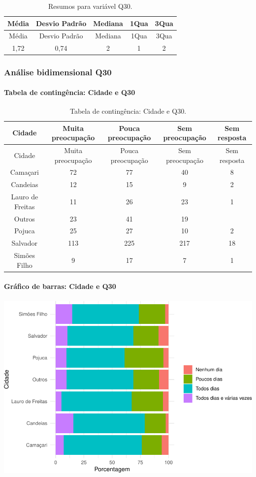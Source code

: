 \documentclass[]{article}
\let\oldparagraph\paragraph
\renewcommand{\paragraph}[1]{\oldparagraph{#1}\mbox{}}
\begin{document}
\begin{longtable}[]{@{}ccccc@{}}
\caption{\label{tab:unnamed-chunk-956}Resumos para variável Q30.}\tabularnewline
\toprule
Média & Desvio Padrão & Mediana & 1Qua & 3Qua\tabularnewline
\midrule
\endfirsthead
\toprule
Média & Desvio Padrão & Mediana & 1Qua & 3Qua\tabularnewline
\midrule
\endhead
1,72 & 0,74 & 2 & 1 & 2\tabularnewline
\bottomrule
\end{longtable}

\cleardoublepage

\hypertarget{anuxe1lise-bidimensional-q30}{%
\subsubsection{Análise bidimensional Q30}\label{anuxe1lise-bidimensional-q30}}

\hypertarget{tabela-de-continguxeancia-cidade-e-q30}{%
\paragraph{Tabela de contingência: Cidade e Q30}\label{tabela-de-continguxeancia-cidade-e-q30}}

\begin{longtable}[]{@{}ccccc@{}}
\caption{\label{tab:unnamed-chunk-957}Tabela de contingência: Cidade e Q30.}\tabularnewline
\toprule
Cidade & Muita preocupação & Pouca preocupação & Sem preocupação & Sem resposta\tabularnewline
\midrule
\endfirsthead
\toprule
Cidade & Muita preocupação & Pouca preocupação & Sem preocupação & Sem resposta\tabularnewline
\midrule
\endhead
Camaçari & 72 & 77 & 40 & 8\tabularnewline
Candeias & 12 & 15 & 9 & 2\tabularnewline
Lauro de Freitas & 11 & 26 & 23 & 1\tabularnewline
Outros & 23 & 41 & 19 &\tabularnewline
Pojuca & 25 & 27 & 10 & 2\tabularnewline
Salvador & 113 & 225 & 217 & 18\tabularnewline
Simões Filho & 9 & 17 & 7 & 1\tabularnewline
\bottomrule
\end{longtable}

\hypertarget{gruxe1fico-de-barras-cidade-e-q30}{%
\paragraph{Gráfico de barras: Cidade e Q30}\label{gruxe1fico-de-barras-cidade-e-q30}}

\begin{center}\includegraphics[width=0.75\linewidth]{relatorio_covid19_files/figure-latex/unnamed-chunk-958-1} \end{center}
\end{document}
